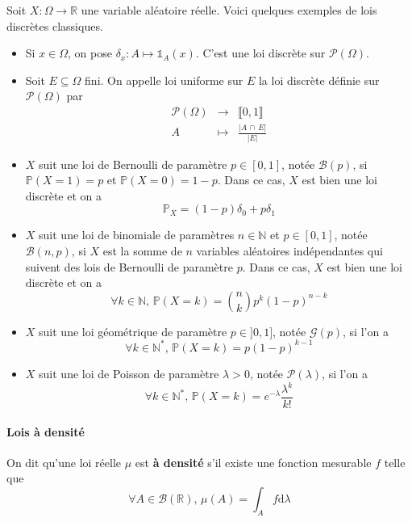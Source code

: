 
	\begin{example}
		\label{261-1}
		Soit $X : \Omega \rightarrow \mathbb{R}$ une variable aléatoire réelle. Voici quelques exemples de lois discrètes classiques.
		\begin{itemize}
			\item \label{261-2} Si $x \in \Omega$, on pose $\delta_x : A \mapsto \mathbb{1}_A(x)$. C'est une loi discrète sur $\mathcal{P}(\Omega)$.
			\item Soit $E \subseteq \Omega$ fini. On appelle loi uniforme sur $E$ la loi discrète définie sur $\mathcal{P}(\Omega)$ par
			\[
			\begin{array}{ccc}
				\mathcal{P}(\Omega) &\rightarrow& \llbracket 0, 1 \rrbracket \\
				A &\mapsto& \frac{\vert A \, \cap \, E \vert}{\vert E \vert}
			\end{array}
			\]
			\item $X$ suit une loi de Bernoulli de paramètre $p \in [0,1]$, notée $\mathcal{B}(p)$, si $\mathbb{P}(X=1) = p$ et $\mathbb{P}(X=0)=1-p$. Dans ce cas, $X$ est bien une loi discrète et on a
			\[ \mathbb{P}_X = (1-p) \delta_0 + p \delta_1 \]
			\item $X$ suit une loi de binomiale de paramètres $n \in \mathbb{N}$ et $p \in [0,1]$, notée $\mathcal{B}(n, p)$, si $X$ est la somme de $n$ variables aléatoires indépendantes qui suivent des lois de Bernoulli de paramètre $p$. Dans ce cas, $X$ est bien une loi discrète et on a
			\[ \forall k \in \mathbb{N}, \, \mathbb{P}(X = k) = \binom{n}{k} p^k (1-p)^{n-k} \]
			\item $X$ suit une loi géométrique de paramètre $p \in ]0,1]$, notée $\mathcal{G}(p)$, si l'on a
			\[ \forall k \in \mathbb{N}^{*}, \, \mathbb{P}(X = k) = p(1-p)^{k-1} \]
			\item $X$ suit une loi de Poisson de paramètre $\lambda > 0$, notée $\mathcal{P}(\lambda)$, si l'on a
			\[ \forall k \in \mathbb{N}^{*}, \, \mathbb{P}(X = k) = e^{-\lambda} \frac{\lambda^k}{k!} \]
		\end{itemize}
	\end{example}

	\paragraph{Lois à densité}


	\begin{definition}
		On dit qu'une loi réelle $\mu$ est \textbf{à densité} s'il existe une fonction mesurable $f$ telle que
		\[ \forall A \in \mathcal{B}(\mathbb{R}), \, \mu(A) = \int_A f \mathrm{d}\lambda \]
	\end{definition}

